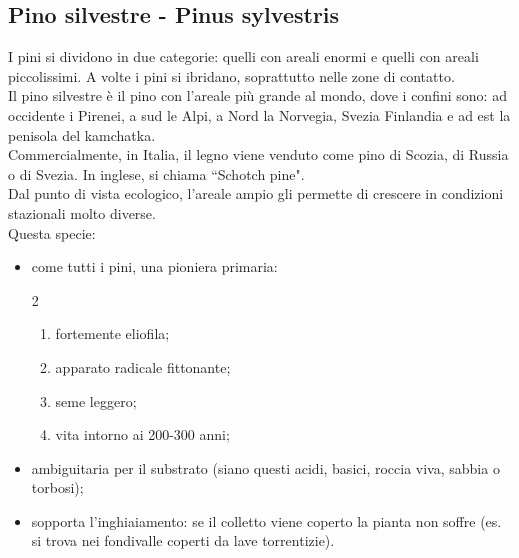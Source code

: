 \subsection{Pino silvestre - Pinus sylvestris}
I pini si dividono in due categorie: quelli con areali enormi e quelli con areali piccolissimi. A volte i pini si ibridano, soprattutto nelle zone di contatto.\\
Il pino silvestre è il pino con l'areale più grande al mondo, dove i confini sono: ad occidente i Pirenei, a sud le Alpi, a Nord la Norvegia, Svezia Finlandia e ad est la penisola del kamchatka.\\
Commercialmente, in Italia, il legno viene venduto come pino di Scozia, di Russia o di Svezia. In inglese, si chiama ``Schotch pine".\\
Dal punto di vista ecologico, l'areale ampio gli permette di crescere in condizioni stazionali molto diverse.\\
Questa specie:
\begin{itemize}[nosep]
    \item come tutti i pini, una pioniera primaria:
    \begin{multicols}{2}
    \begin{enumerate}[nosep]
        \item fortemente eliofila;
        \item apparato radicale fittonante;
        \item seme leggero;
        \item vita intorno ai 200-300 anni;
    \end{enumerate}
 \end{multicols}
    \item ambiguitaria per il substrato (siano questi acidi, basici, roccia viva, sabbia o torbosi);
    \item sopporta l'inghiaiamento: se il colletto viene coperto la pianta non soffre (es. si trova nei fondivalle coperti da lave torrentizie).
\end{itemize}